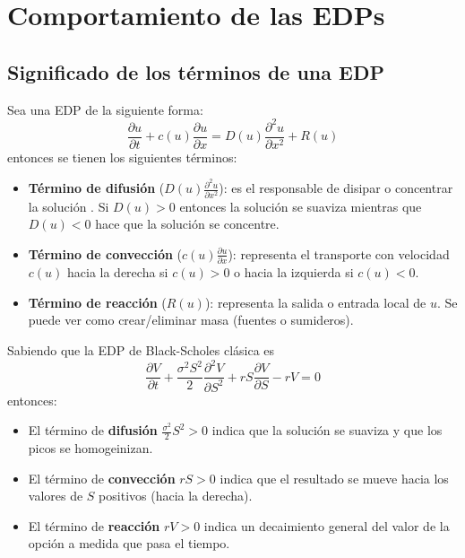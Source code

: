
\section{Comportamiento de las EDPs}

\subsection{Significado de los términos de una EDP}
Sea una EDP de la siguiente forma:
$$\frac{\partial u}{\partial t} + c(u) \frac{\partial u}{\partial x} = D(u) \frac{\partial^2 u}{\partial x^2} + R(u)$$
entonces se tienen los siguientes términos:
\begin{itemize}
    \item \textbf{Término de difusión} ($D(u) \frac{\partial^2 u}{\partial x^2}$): es el responsable de disipar o concentrar la solución . Si $D(u)>0$ entonces la solución se suaviza mientras que $D(u)<0$ hace que la solución se concentre. 
    \item \textbf{Término de convección} ($c(u) \frac{\partial u}{\partial x}$): representa el transporte con velocidad $c(u)$ hacia la derecha si $c(u)>0$ o hacia la izquierda si $c(u)<0$.
    \item \textbf{Término de reacción} ($R(u)$): representa la salida o entrada local de $u$. Se puede ver como crear/eliminar masa (fuentes o sumideros).
\end{itemize}

Sabiendo que la EDP de Black-Scholes clásica es
$$\frac{\partial V}{\partial t} + \frac{\sigma^2S^2}{2} \frac{\partial^2 V}{\partial S^2} + rS \frac{\partial V}{\partial S} -rV = 0 $$
entonces:
\begin{itemize}
    \item El término de \textbf{difusión} $\frac{\sigma^2}{2}S^2 > 0$ indica que la solución se suaviza y que los picos se homogeinizan.
    \item El término de \textbf{convección} $rS > 0$ indica que el resultado se mueve hacia los valores de $S$ positivos (hacia la derecha).
    \item El término de \textbf{reacción} $rV > 0$ indica un decaimiento general del valor de la opción a medida que pasa el tiempo.
\end{itemize}













